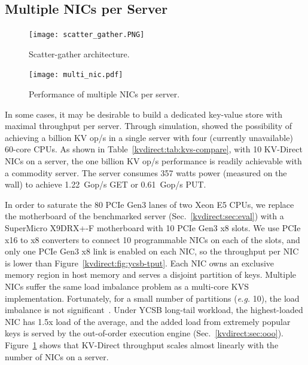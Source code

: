 \subsection{Multiple NICs per Server}
\label{kvdirect:sec:multi-nic}

\begin{figure}[t]
\begin{minipage}[t]{0.5\textwidth}
\centering
\texttt{[image: scatter\_gather.PNG]}
\caption{Scatter-gather architecture.}
\label{kvdirect:fig:sg-arch}
\end{minipage}
\begin{minipage}[t]{0.5\textwidth}
\centering
\texttt{[image: multi\_nic.pdf]}
\caption{Performance of multiple NICs per server.}
\label{kvdirect:fig:multiple-nics}
\end{minipage}

\end{figure}

In some cases, it may be desirable to build a dedicated key-value store with maximal throughput per server.
Through simulation, \cite{li2016full} showed the possibility of achieving a billion KV op/s in a single server with four (currently unavailable) 60-core CPUs.
As shown in Table~\ref{kvdirect:tab:kvs-compare}, with 10 KV-Direct NICs on a server, the one billion KV op/s performance is readily achievable with a commodity server.
The server consumes 357 watts power (measured on the wall) to achieve 1.22~Gop/s GET or 0.61~Gop/s PUT.

In order to saturate the 80 PCIe Gen3 lanes of two Xeon E5 CPUs, we replace the motherboard of the benchmarked server (Sec.~\ref{kvdirect:sec:eval}) with a SuperMicro X9DRX+-F motherboard with 10 PCIe Gen3 x8 slots.
We use PCIe x16 to x8 converters to connect 10 programmable NICs on each of the slots, and only one PCIe Gen3 x8 link is enabled on each NIC, so the throughput per NIC is lower than Figure~\ref{kvdirect:fig:ycsb-tput}.
Each NIC owns an exclusive memory region in host memory and serves a disjoint partition of keys.
Multiple NICs suffer the same load imbalance problem as a multi-core KVS implementation.
Fortunately, for a small number of partitions (\textit{e.g.} 10), the load imbalance is not significant~\cite{lim2014mica,li2016full}. Under YCSB long-tail workload, the highest-loaded NIC has 1.5x load of the average, and the added load from extremely popular keys is served by the out-of-order execution engine (Sec.~\ref{kvdirect:sec:ooo}).
Figure~\ref{kvdirect:fig:multiple-nics} shows that KV-Direct throughput scales almost linearly with the number of NICs on a server.



